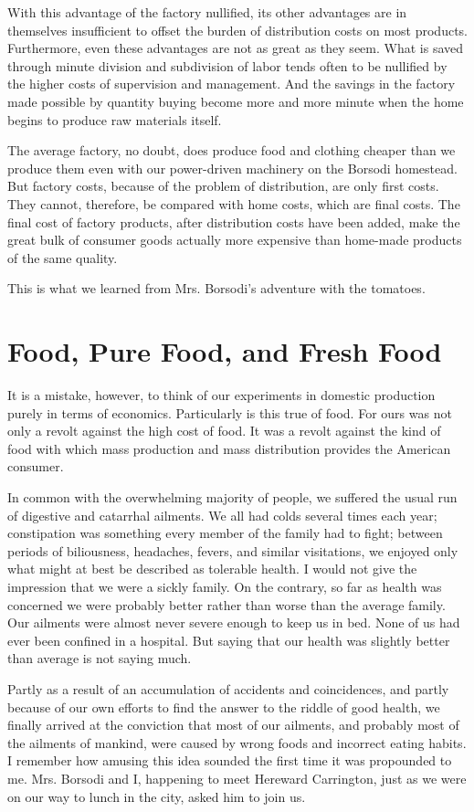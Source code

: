 \documentclass{book}
\begin{document}
With this advantage of the factory nullified, its other advantages are in themselves insufficient to offset the burden of distribution costs on most products. Furthermore, even these advantages are not as great as they seem. What is saved through minute division and subdivision of labor tends often to be nullified by the higher costs of supervision and management. And the savings in the factory made possible by quantity buying become more and more minute when the home begins to produce raw materials itself.

The average factory, no doubt, does produce food and clothing cheaper than we produce them even with our power-driven machinery on the Borsodi homestead. But factory costs, because of the problem of distribution, are only first costs. They cannot, therefore, be compared with home costs, which are final costs. The final cost of factory products, after distribution costs have been added, make the great bulk of consumer goods actually more expensive than home-made products of the same quality.

This is what we learned from Mrs. Borsodi’s adventure with the tomatoes.

\chapter{Food, Pure Food, and Fresh Food}
\label{chapter-3}
It is a mistake, however, to think of our experiments in domestic production purely in terms of economics. Particularly is this true of food. For ours was not only a revolt against the high cost of food. It was a revolt against the kind of food with which mass production and mass distribution provides the American consumer.

In common with the overwhelming majority of people, we suffered the usual run of digestive and catarrhal ailments. We all had colds several times each year; constipation was something every member of the family had to fight; between periods of biliousness, headaches, fevers, and similar visitations, we enjoyed only what might at best be described as tolerable health. I would not give the impression that we were a sickly family. On the contrary, so far as health was concerned we were probably better rather than worse than the average family. Our ailments were almost never severe enough to keep us in bed. None of us had ever been confined in a hospital. But saying that our health was slightly better than average is not saying much.

Partly as a result of an accumulation of accidents and coincidences, and partly because of our own efforts to find the answer to the riddle of good health, we finally arrived at the conviction that most of our ailments, and probably most of the ailments of mankind, were caused by wrong foods and incorrect eating habits. I remember how amusing this idea sounded the first time it was propounded to me. Mrs. Borsodi and I, happening to meet Hereward Carrington, just as we were on our way to lunch in the city, asked him to join us.
\end{document}

